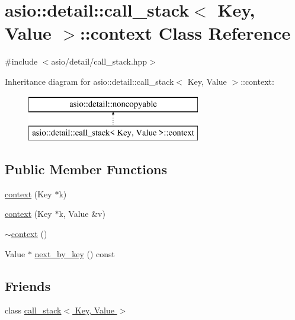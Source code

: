 \hypertarget{classasio_1_1detail_1_1call__stack_1_1context}{}\section{asio\+:\+:detail\+:\+:call\+\_\+stack$<$ Key, Value $>$\+:\+:context Class Reference}
\label{classasio_1_1detail_1_1call__stack_1_1context}


{\ttfamily \#include $<$asio/detail/call\+\_\+stack.\+hpp$>$}

Inheritance diagram for asio\+:\+:detail\+:\+:call\+\_\+stack$<$ Key, Value $>$\+:\+:context\+:\begin{figure}[H]
\begin{center}
\leavevmode
\includegraphics[height=2.000000cm]{classasio_1_1detail_1_1call__stack_1_1context}
\end{center}
\end{figure}
\subsection*{Public Member Functions}
\begin{DoxyCompactItemize}
\item 
\hyperlink{classasio_1_1detail_1_1call__stack_1_1context_a99fb9e977507edbdf3d6ee2cb591b7cf}{context} (Key $\ast$k)
\item 
\hyperlink{classasio_1_1detail_1_1call__stack_1_1context_a72c972cc177b7f4ae7d4517aeb1ff33a}{context} (Key $\ast$k, Value \&v)
\item 
\hyperlink{classasio_1_1detail_1_1call__stack_1_1context_a24ef09956e9cf6c5c1cc494a5d25bc0b}{$\sim$context} ()
\item 
Value $\ast$ \hyperlink{classasio_1_1detail_1_1call__stack_1_1context_a02becdb9c673713de9bfb5eeb9ea9109}{next\+\_\+by\+\_\+key} () const 
\end{DoxyCompactItemize}
\subsection*{Friends}
\begin{DoxyCompactItemize}
\item 
class \hyperlink{classasio_1_1detail_1_1call__stack_1_1context_a3bc7e70c9cc3b79c5256516316cc3ea9}{call\+\_\+stack$<$ Key, Value $>$}
\end{DoxyCompactItemize}


